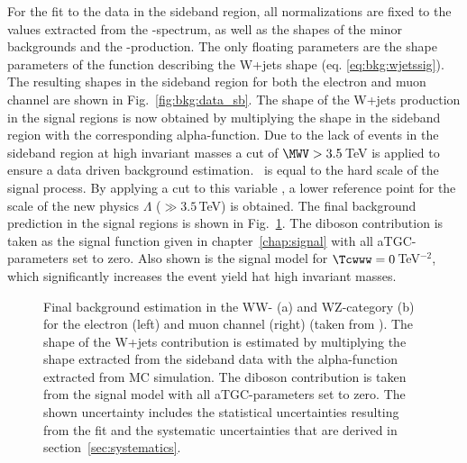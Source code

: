 \noindent For the fit to the data in the sideband region, all normalizations are fixed to the values extracted from the \Mpr -spectrum, as well as the shapes of the minor backgrounds and the \ttbar -production. The only floating parameters are the shape parameters of the function describing the W+jets shape (eq. \ref{eq:bkg:wjetssig}). The resulting shapes in the sideband region for both the electron and muon channel are shown in Fig.~\ref{fig:bkg:data_sb}. The shape of the W+jets production in the signal regions is now obtained by multiplying the shape in the sideband region with the corresponding alpha-function. Due to the lack of events in the sideband region at high invariant masses a cut of $\MWV > 3.5$\,TeV is applied to ensure a data driven background estimation. \MWV \ is equal to the hard scale of the signal process. By applying a cut to this variable , a lower reference point for the scale of the new physics $\Lambda$ ($\gg3.5$\,TeV) is obtained. The final background prediction in the signal regions is shown in Fig.~\ref{fig:bkg:mwv_final}. The diboson contribution is taken as the signal function given in chapter~\ref{chap:signal} with all aTGC-parameters set to zero. Also shown is the signal model for $\Tcwww = 0$\,TeV$^{-2}$, which significantly increases the event yield hat high invariant masses.
 \begin{figure}
	\centering
	\caption[Final background estimation in the WW- and WZ-category for the electron and muon channel]{Final background estimation in the WW- (a) and WZ-category (b) for the electron (left) and muon channel (right) (taken from \cite{PAS}). The shape of the W+jets contribution is estimated by multiplying the shape extracted from the sideband data with the alpha-function extracted from MC simulation. The diboson contribution is taken from the signal model with all aTGC-parameters set to zero. The shown uncertainty includes the statistical uncertainties resulting from the fit and the systematic uncertainties that are derived in section~\ref{sec:systematics}.}
	\label{fig:bkg:mwv_final}
\end{figure}


